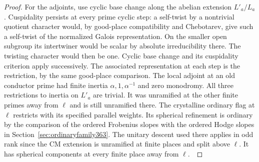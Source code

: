 \documentclass[a4paper,11pt]{article}
\theoremstyle{definition}
\theoremstyle{remark}
\numberwithin{equation}{section}
\begin{document}
\begin{proof}
For the adjoints, use cyclic base change along the abelian
extension \(L'_a/L_a\). Cuspidality persists at every prime
cyclic step: a self-twist by a nontrivial quotient character
would, by good-place compatibility and Chebotarev, give such a
self-twist of the normalized Galois representation. On the
smaller open subgroup its intertwiner would be scalar by
absolute irreducibility there. The twisting character would
then be one. Cyclic base change and its cuspidality criterion
apply successively. The associated representation at each step
is the restriction, by the same good-place comparison.
The local adjoint at an old conductor prime had finite
inertia \(\alpha,1,\alpha^{-1}\) and zero monodromy.
All three restrictions to inertia on \(L'_a\) are trivial.
It was unramified at the other finite primes away from \(\ell\)
and is still unramified there. The crystalline ordinary flag at
\(\ell\) restricts with its specified parallel weights. Its
spherical refinement is ordinary by the comparison of the
ordered Frobenius slopes with the ordered Hodge slopes in
Section~\ref{sec:ordinaryfamily363}. The unitary descent used
there applies in odd rank since the CM extension is unramified
at finite places and split above \(\ell\). It has spherical
components at every finite place away from \(\ell\).
\,\cite{VIII-VI-I-ac123,VIII-VI-geraghty363,VIII-VI-V-shin}
\end{proof}
\end{document}
